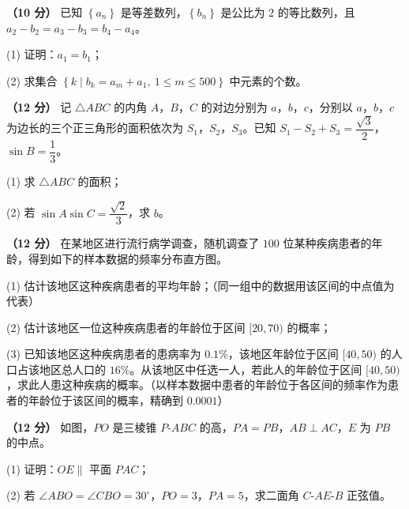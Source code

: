 \begin{question}
\textbf{（10 分）} 已知 $\left\{a_n\right\}$ 是等差数列，$\left\{b_n\right\}$ 是公比为 $2$ 的等比数列，且 $a_2-b_2=a_3-b_3=b_4-a_4$。

  (1) 证明：$a_1=b_1$；

  (2) 求集合 $\left\{k\mid b_k=a_m+a_1,\ 1\le m\le500\right\}$ 中元素的个数。

\end{question}
\begin{question}
\textbf{（12 分）} 记 $\triangle ABC$ 的内角 $A$，$B$，$C$ 的对边分别为 $a$，$b$，$c$，分别以 $a$，$b$，$c$ 为边长的三个正三角形的面积依次为 $S_1$，$S_2$，$S_3$。已知 $S_1-S_2+S_3=\dfrac{\sqrt3}2$，$\sin B=\dfrac13$。

  (1) 求 $\triangle ABC$ 的面积；

  (2) 若 $\sin A\sin C=\dfrac{\sqrt2}3$，求 $b$。

\Needspace{0.4\textheight}
\end{question}
\begin{question}
\textbf{（12 分）} 在某地区进行流行病学调查，随机调查了 $100$ 位某种疾病患者的年龄，得到如下的样本数据的频率分布直方图。
\nopagebreak[4]
\begin{center}\end{center}
\nopagebreak[4]
  (1) 估计该地区这种疾病患者的平均年龄；（同一组中的数据用该区间的中点值为代表）

  (2) 估计该地区一位这种疾病患者的年龄位于区间 $[20,70)$ 的概率；

  (3) 已知该地区这种疾病患者的患病率为 $0.1\%$，该地区年龄位于区间 $[40,50)$ 的人口占该地区总人口的 $16\%$。从该地区中任选一人，若此人的年龄位于区间 $[40,50)$，求此人患这种疾病的概率。（以样本数据中患者的年龄位于各区间的频率作为患者的年龄位于该区间的概率，精确到 $0.0001$）

\Needspace{0.4\textheight}
\end{question}
\begin{question}
\textbf{（12 分）} 如图，$PO$ 是三棱锥 $P\text{-}ABC$ 的高，$PA=PB$，$AB\perp AC$，$E$ 为 $PB$ 的中点。
\nopagebreak[4]
\begin{center}\end{center}
\nopagebreak[4]
  (1) 证明：$OE\parallel$ 平面 $PAC$；

  (2) 若 $\angle ABO=\angle CBO=30^\circ$，$PO=3$，$PA=5$，求二面角 $C\text{-}AE\text{-}B$ 正弦值。

\end{question}
